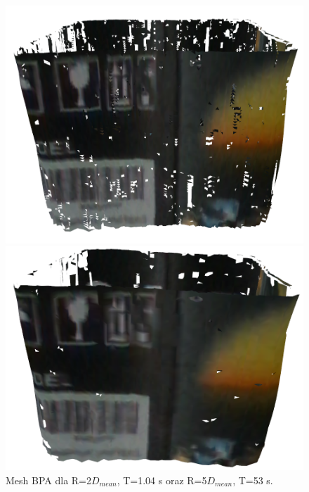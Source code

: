 \begin{figure}[H]
\centering
    \begin{minipage}[b]{0.45\linewidth}
        \includegraphics[scale=0.3]{bpaBox2x.PNG}
    \end{minipage}
\quad
    \begin{minipage}[b]{0.45\linewidth}
        \includegraphics[scale=0.3]{bpaBox5x.PNG}
    \end{minipage}
\caption{Mesh BPA dla R=2$D_{mean}$, T=1.04 s oraz R=5$D_{mean}$, T=53 s.}
\label{fig:boxComparison1}
\end{figure}

